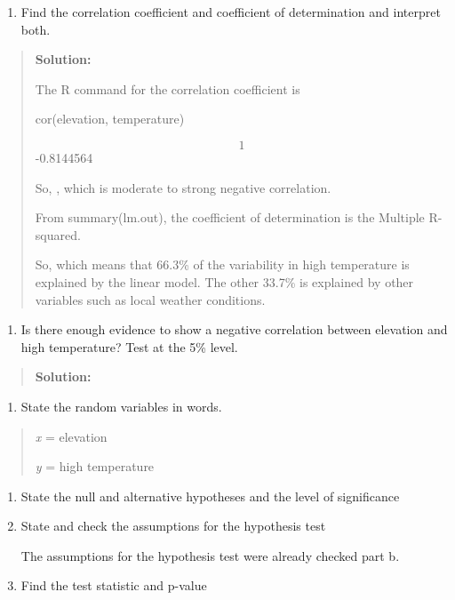 \documentclass[]{book}
\providecommand{\tightlist}{%
  \setlength{\itemsep}{0pt}\setlength{\parskip}{0pt}}
\begin{document}
\begin{enumerate}
\def\labelenumi{\alph{enumi}.}
\setcounter{enumi}{6}
\tightlist
\item
  Find the correlation coefficient and coefficient of determination
  and interpret both.
\end{enumerate}

\begin{quote}
\textbf{Solution:}

The R command for the correlation coefficient is

cor(elevation, temperature)

\[1\] -0.8144564

So, , which is moderate to strong negative correlation.

From summary(lm.out), the coefficient of determination is the Multiple
R-squared.

So, which means that 66.3\% of the variability in high temperature is
explained by the linear model. The other 33.7\% is explained by other
variables such as local weather conditions.
\end{quote}

\begin{enumerate}
\def\labelenumi{\alph{enumi}.}
\setcounter{enumi}{7}
\tightlist
\item
  Is there enough evidence to show a negative correlation between
  elevation and high temperature? Test at the 5\% level.
\end{enumerate}

\begin{quote}
\textbf{Solution:}
\end{quote}

\begin{enumerate}
\def\labelenumi{\arabic{enumi}.}
\tightlist
\item
  State the random variables in words.
\end{enumerate}

\begin{quote}
\emph{x} = elevation

\emph{y} = high temperature
\end{quote}

\begin{enumerate}
\def\labelenumi{\arabic{enumi}.}
\setcounter{enumi}{1}
\item
  State the null and alternative hypotheses and the level of
  significance
\item
  State and check the assumptions for the hypothesis test

  The assumptions for the hypothesis test were already checked part b.
\item
  Find the test statistic and p-value
\end{enumerate}
\end{document}
